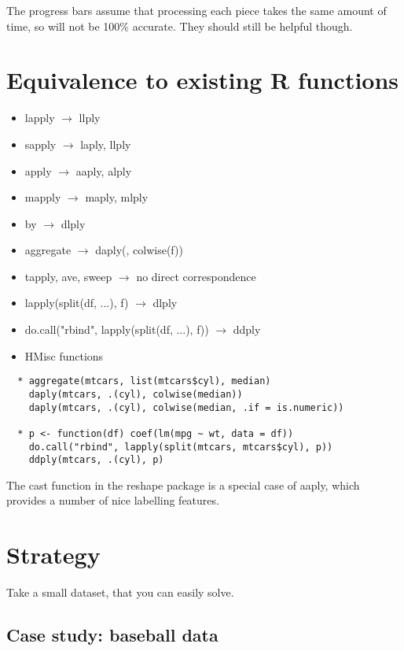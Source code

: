 \documentclass[letterpaper,oneside]{scrartcl}
\begin{document}
The progress bars assume that processing each piece takes the same amount of time, so will not be 100\% accurate.  They should still be helpful though.

\section{Equivalence to existing R functions}
\label{sec:equiv}

\begin{itemize}
  \item lapply $\to$ llply
  \item sapply $\to$ laply, llply
  \item apply  $\to$ aaply, alply
  \item mapply $\to$ maply, mlply
  \item by $\to$ dlply
  \item aggregate $\to$ daply(, colwise(f))
  \item tapply, ave, sweep $\to$ no direct correspondence
  \item lapply(split(df, ...), f) $\to$ dlply
  \item do.call("rbind", lapply(split(df, ...), f)) $\to$ ddply
  \item HMisc functions
\end{itemize}

\begin{verbatim}
  * aggregate(mtcars, list(mtcars$cyl), median)
    daply(mtcars, .(cyl), colwise(median))
    daply(mtcars, .(cyl), colwise(median, .if = is.numeric))
    
  * p <- function(df) coef(lm(mpg ~ wt, data = df))
    do.call("rbind", lapply(split(mtcars, mtcars$cyl), p))
    ddply(mtcars, .(cyl), p)  
\end{verbatim}

The cast function in the reshape package \citep{reshape} is a special case of aaply, which provides a number of nice labelling features.

\section{Strategy}

Take a small dataset, that you can easily solve.  

\subsection{Case study: baseball data}
\end{document}
